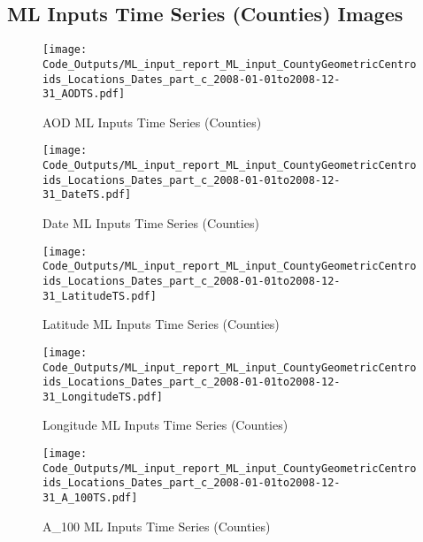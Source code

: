 
\subsection{ML Inputs Time Series (Counties) Images} 
 

\begin{figure} 
\centering  
\texttt{[image: Code\_Outputs/ML\_input\_report\_ML\_input\_CountyGeometricCentroids\_Locations\_Dates\_part\_c\_2008-01-01to2008-12-31\_AODTS.pdf]} 
\caption{\label{fig:ML_input_report_ML_input_CountyGeometricCentroids_Locations_Dates_part_c_2008-01-01to2008-12-31AODTS}AOD ML Inputs Time Series (Counties)} 
\end{figure} 
 

\begin{figure} 
\centering  
\texttt{[image: Code\_Outputs/ML\_input\_report\_ML\_input\_CountyGeometricCentroids\_Locations\_Dates\_part\_c\_2008-01-01to2008-12-31\_DateTS.pdf]} 
\caption{\label{fig:ML_input_report_ML_input_CountyGeometricCentroids_Locations_Dates_part_c_2008-01-01to2008-12-31DateTS}Date ML Inputs Time Series (Counties)} 
\end{figure} 
 

\begin{figure} 
\centering  
\texttt{[image: Code\_Outputs/ML\_input\_report\_ML\_input\_CountyGeometricCentroids\_Locations\_Dates\_part\_c\_2008-01-01to2008-12-31\_LatitudeTS.pdf]} 
\caption{\label{fig:ML_input_report_ML_input_CountyGeometricCentroids_Locations_Dates_part_c_2008-01-01to2008-12-31LatitudeTS}Latitude ML Inputs Time Series (Counties)} 
\end{figure} 
 

\begin{figure} 
\centering  
\texttt{[image: Code\_Outputs/ML\_input\_report\_ML\_input\_CountyGeometricCentroids\_Locations\_Dates\_part\_c\_2008-01-01to2008-12-31\_LongitudeTS.pdf]} 
\caption{\label{fig:ML_input_report_ML_input_CountyGeometricCentroids_Locations_Dates_part_c_2008-01-01to2008-12-31LongitudeTS}Longitude ML Inputs Time Series (Counties)} 
\end{figure} 
 

\begin{figure} 
\centering  
\texttt{[image: Code\_Outputs/ML\_input\_report\_ML\_input\_CountyGeometricCentroids\_Locations\_Dates\_part\_c\_2008-01-01to2008-12-31\_A\_100TS.pdf]} 
\caption{\label{fig:ML_input_report_ML_input_CountyGeometricCentroids_Locations_Dates_part_c_2008-01-01to2008-12-31A_100TS}A_100 ML Inputs Time Series (Counties)} 
\end{figure} 
 

